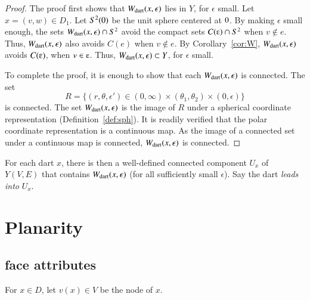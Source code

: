 \begin{proof}  The proof first shows that $W_{\text{dart}}(x,\epsilon)$ lies in $Y$,
for $\epsilon$ small.  Let $x=(v,w)\in D_1$.  
Let $S^2(0)$ be the unit sphere centered at $0$.
By making $\epsilon$ small enough,
the sets $W_{\text{dart}}(x,\epsilon)\cap S^2$
avoid the compact sets $C(\e)\cap S^2$ when $v\not\in e$.
Thus, $W_{\text{dart}}(x,\epsilon)$ also avoids $C(e)$ when $v\not\in e$.
By Corollary~\ref{cor:W}, $W_{\text{dart}}(x,\epsilon)$ avoids $C(\e)$, when $v\in \e$.
Thus, $W_{\text{dart}}(x,\epsilon)\subset Y$, for $\epsilon$ small.

To complete the proof, it is enough to show that each $W_{\text{dart}}(x,\epsilon)$ is
connected.  
The  set
   $$
   R=\{(r,\theta,\epsilon') \in (0,\infty) \times (\theta_1,\theta_2) \times (0,\epsilon)\}
   $$
is connected.
The set $W_{\text{dart}}(x,\epsilon)$  is the image of $R$
under a spherical coordinate representation (Definition~\ref{def:sph}).
It is readily verified that the polar coordinate representation is
a continuous map. As the image of a connected set under a continuous map
is connected, $W_{\text{dart}}(x,\epsilon)$ is connected.
\end{proof}

\begin{definition} For each dart $x$, 
there is then a well-defined connected
component $U_x$ of $Y(V,E)$ 
that contains $W_{\text{dart}}(x,\epsilon)$ (for all
sufficiently small $\epsilon$). Say the dart {\it leads into}
$U_x$.
\end{definition}


\section{Planarity}


\subsection{face attributes}

For $x\in D$, let $v(x)\in V$ be the node of $x$.


